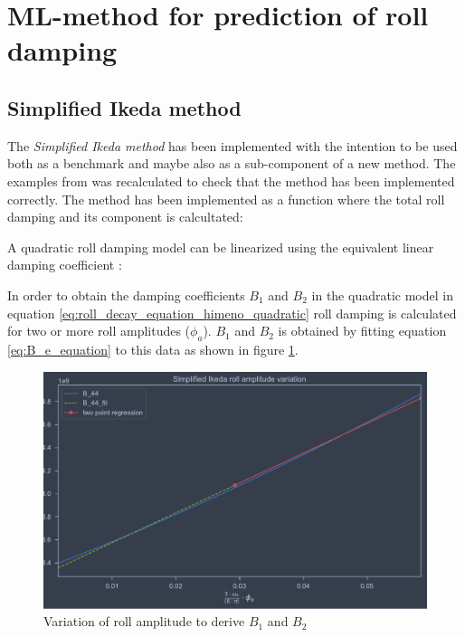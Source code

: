 \section{ML-method for prediction of roll damping}
\label{se:regression} 

\subsection{Simplified Ikeda method}
\label{se:simplified_ikeda}
The \emph{Simplified Ikeda method} \cite{kawahara_simple_2011} has been implemented with the intention to be used both as a benchmark and maybe also as a sub-component of a new method. The examples from \cite{kawahara_simple_2011} was recalculated to check that the method has been implemented correctly.
The method has been implemented as a function where the total roll damping and its component is calcultated: 


A quadratic roll damping model can be linearized using the equivalent linear damping coefficient \cite{himeno_prediction_1981}:

In order to obtain the damping coefficients $B_1$ and $B_2$ in the quadratic model in equation \ref{eq:roll_decay_equation_himeno_quadratic} roll damping is calculated for two or more roll amplitudes ($\phi_a$). $B_1$ and $B_2$ is obtained by fitting equation \ref{eq:B_e_equation} to this data as shown in figure \ref{fig:ikeda_B_1_B2}.  

\begin{figure}[H]
    \centering
    \includegraphics[width=\columnwidth]{figures/ikeda_B_1_B_2.pdf}
    \caption{Variation of roll amplitude to derive $B_1$ and $B_2$}
    \label{fig:ikeda_B_1_B2}
\end{figure}

